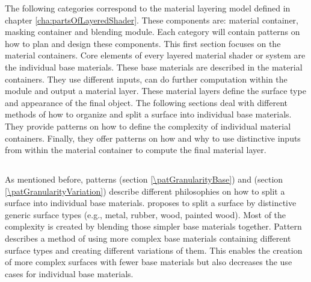 The following categories correspond to the material layering model defined in chapter \ref{cha:partsOfLayeredShader}. These components are: material container, masking container and blending module. Each category will contain patterns on how to plan and design these components. This first section focuses on the material containers. Core elements of every layered material shader or system are the individual base materials. These base materials are described in the material containers. They use different inputs, can do further computation within the module and output a material layer. These material layers define the surface type and appearance of the final object. The following sections deal with different methods of how to organize and split a surface into individual base materials. They provide patterns on how to define the complexity of individual material containers. Finally, they offer patterns on how and why to use distinctive inputs from within the material container to compute the final material layer. 

\subsection{\patCatGranularity}\label{\patCatGranularity}

As mentioned before, patterns \emph{\patGranularityBase} (section \ref{\patGranularityBase}) and \emph{\patGranularityVariation} (section \ref{\patGranularityVariation}) describe different philosophies on how to split a surface into individual base materials.  \emph{\patGranularityBase} proposes to split a surface by distinctive generic surface types (e.g., metal, rubber, wood, painted wood). Most of the complexity is created by blending those simpler base materials together. Pattern \emph{\patGranularityVariation} describes a method of using more complex base materials containing different surface types and creating different variations of them. This enables the creation of more complex surfaces with fewer base materials but also decreases the use cases for individual base materials.  

